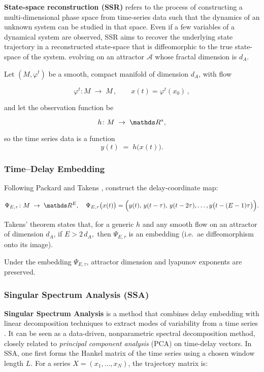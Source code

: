 \documentclass[14pt]{extarticle}
\begin{document}
	\textbf{State-space reconstruction (SSR)} refers to the process of constructing a multi-dimensional phase space from time-series data such that the dynamics of an unknown system can be studied in that space. 
	Even if a few variables of a dynamical system are observed, SSR aims to recover the underlying state trajectory  in a reconstructed state-space that is diffeomorphic to the true state-space of the system.
	evolving on an attractor $\mathcal{A}$ whose fractal dimension is $d_A$.  
	
	Let $(M, \varphi^t)$ be a smooth, compact manifold of dimension $d_A$, with flow
	
	$$
	\varphi^t\colon M\;\to\;M\,,\qquad x(t)=\varphi^t(x_0)\,,
	$$
	
	and let the observation function be
	
	$$
	h\colon M\;\to\;\dR^s, 
	$$
	
	so the time series data is a function $$ y(t)\;=\;h\bigl(x(t)\bigr). $$
	
	\subsubsection*{Time–Delay Embedding}
	
	Following Packard \citep{Packard1980} and Takens \citep{Takens1981}, construct the delay‐coordinate map:
	
	$$
	\Psi_{E,\tau}\colon M\;\to\;\dR^E,
	\quad
	\Psi_{E,\tau}\bigl(x(t)\bigr)
	=\Bigl(y(t),\,y(t-\tau),\,y(t-2\tau),\dots,y\bigl(t-(E-1)\tau\bigr)\Bigr).
	$$
	
	Takens’ theorem states that, for a generic $h$ and any smooth flow on an attractor of dimension $d_A$, if $E > 2\,d_A,$ then $\Psi_{E,\tau}$ is an embedding (i.e.\ ae diffeomorphism onto its image).
	
	Under the embedding $\Psi_{E,\tau}$, attractor dimension and lyapunov exponents are preserved.
	
	\subsubsection*{Singular Spectrum Analysis (SSA)}
	
	\textbf{Singular Spectrum Analysis} is a method that combines delay embedding with linear decomposition techniques to extract modes of variability from a time series \citep{Broomhead1986,Vautard1992,Golyandina2001}. It can be seen as a data-driven, nonparametric spectral decomposition method, closely related to \textit{principal component analysis} (PCA) on time-delay vectors. In SSA, one first forms the Hankel matrix of the time series using a chosen window length $L$. For a series $X = (x_1, \dots, x_N)$, the trajectory matrix is: 
	
\end{document}
